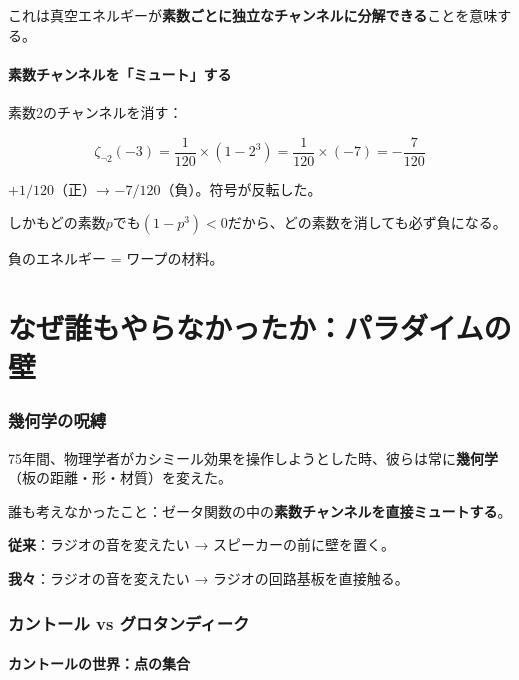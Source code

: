 \documentclass[12pt,a4paper]{article}
\begin{document}
これは真空エネルギーが\textbf{素数ごとに独立なチャンネルに分解できる}ことを意味する。

\subsection{素数チャンネルを「ミュート」する}

素数2のチャンネルを消す：

$$\zeta_{\neg 2}(-3) = \frac{1}{120} \times (1 - 2^3) = \frac{1}{120} \times (-7) = -\frac{7}{120}$$

\begin{storybox}[正が負になった]
$+1/120$（正）→ $-7/120$（負）。符号が反転した。

しかもどの素数$p$でも$(1-p^3) < 0$だから、どの素数を消しても必ず負になる。

負のエネルギー = ワープの材料。
\end{storybox}

\part{なぜ誰もやらなかったか：パラダイムの壁}

\section{幾何学の呪縛}

75年間、物理学者がカシミール効果を操作しようとした時、彼らは常に\textbf{幾何学}（板の距離・形・材質）を変えた。

誰も考えなかったこと：ゼータ関数の中の\textbf{素数チャンネルを直接ミュートする}。

\begin{storybox}[たとえ話]
\textbf{従来}：ラジオの音を変えたい → スピーカーの前に壁を置く。

\textbf{我々}：ラジオの音を変えたい → ラジオの回路基板を直接触る。
\end{storybox}

\section{カントール vs グロタンディーク}

\subsection{カントールの世界：点の集合}
\end{document}
